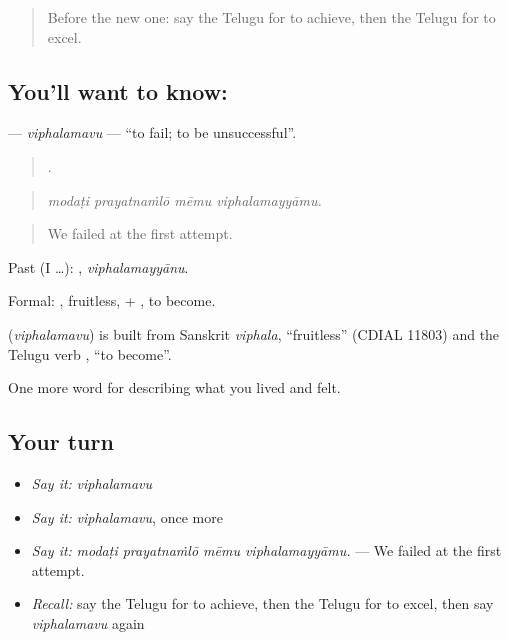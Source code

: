 \label{lesson:TE-C527-viphalamavu}



\begin{quote}
Before the new one: say the Telugu for to achieve, then the Telugu for to excel.
\end{quote}

\subsection*{You'll want to know: }
\textbf{} — \emph{viphalamavu} — \textquotedblleft{}to fail; to be unsuccessful\textquotedblright{}.

\begin{quote}
   .
\end{quote}

\begin{quote}
\emph{modaṭi prayatnaṁlō mēmu viphalamayyāmu.}
\end{quote}

\begin{quote}
We failed at the first attempt.
\end{quote}

Past (I …): , \emph{viphalamayyānu}.

Formal: , fruitless, + , to become.

\begin{cousinweb}
\textbf{} (\emph{viphalamavu}) is built from Sanskrit \emph{viphala}, \textquotedblleft{}fruitless\textquotedblright{} (CDIAL 11803) and the Telugu verb , \textquotedblleft{}to become\textquotedblright{}.
\end{cousinweb}

\begin{grammarlens}[title={What you've built}]
One more word for describing what you lived and felt.
\end{grammarlens}

\subsection*{Your turn}
\begin{itemize}
\raggedright
  \item \emph{Say it:} \emph{viphalamavu}
  \item \emph{Say it:} \emph{viphalamavu}, once more
  \item \emph{Say it:} \emph{modaṭi prayatnaṁlō mēmu viphalamayyāmu.} — We failed at the first attempt.
  \item \emph{Recall:} say the Telugu for to achieve, then the Telugu for to excel, then say \emph{viphalamavu} again
\end{itemize}

